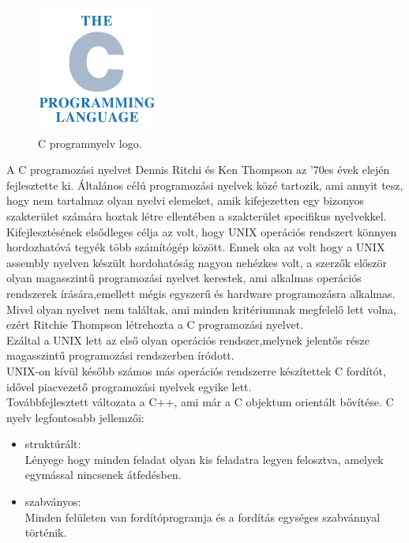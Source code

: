 \begin{figure}[h]
\centering
\includegraphics[scale=0.6]{images/c_prog.png}
\caption{C programnyelv logo.}
\end{figure}
A C programozási nyelvet Dennis Ritchi és Ken Thompson az '70es évek elején fejlesztette ki. Általános célú programozási nyelvek közé tartozik, ami annyit tesz, hogy nem tartalmaz olyan nyelvi elemeket, amik kifejezetten egy bizonyos szakterület számára hoztak létre ellentében a szakterület specifikus nyelvekkel.\\

Kifejlesztésének elsődleges célja az volt, hogy  UNIX operációs rendszert könnyen hordozhatóvá tegyék több számítógép között.
Ennek oka az volt hogy a UNIX assembly nyelven készült hordohatóság nagyon nehézkes volt, a szerzők először olyan magasszintű programozási nyelvet kerestek, ami alkalmas operációs rendszerek írására,emellett mégis egyszerű és hardware programozásra alkalmas. Mivel olyan nyelvet nem találtak, ami minden kritériumnak megfelelő lett volna, ezért Ritchie Thompson létrehozta a C programozási nyelvet.\cite{brian1978thec}\\

Ezáltal a UNIX lett az első olyan operációs rendszer,melynek jelentős része magasszintű programozási rendszerben íródott.\\

UNIX-on kívül később számos más operációs rendszerre készítettek C fordítót, idővel piacvezető programozási nyelvek egyike lett.\\

\noindent Továbbfejlesztett változata a C++, ami már a C objektum orientált bővítése.
\newpage
\noindent C nyelv legfontosabb jellemzői:
\begin{itemize}
\item struktúrált:\\
Lényege hogy minden feladat olyan kis feladatra legyen felosztva, amelyek egymással nincsenek átfedésben.
\item  szabványos:\\
Minden felületen van fordítóprogramja és a fordítás egységes szabvánnyal történik.
\end{itemize}

